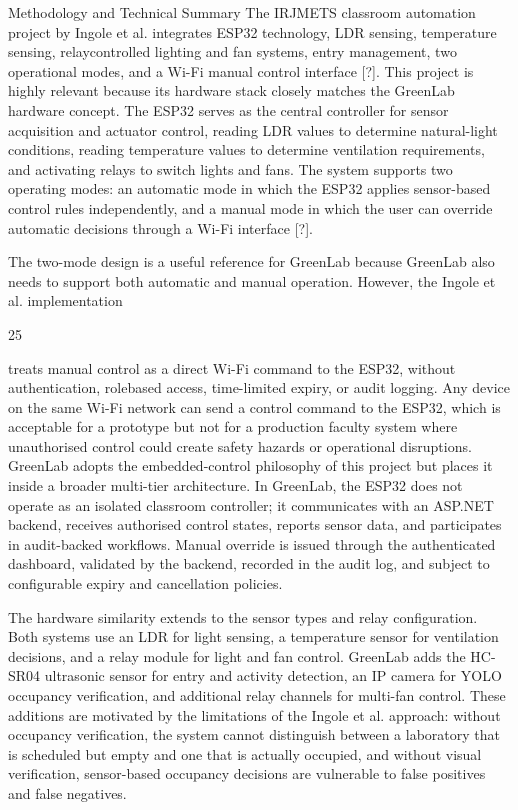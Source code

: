 Methodology and Technical Summary The IRJMETS classroom automation project
by Ingole et al. integrates ESP32 technology, LDR sensing, temperature sensing, relaycontrolled lighting and fan systems, entry management, two operational modes, and a
Wi-Fi manual control interface [?]. This project is highly relevant because its hardware
stack closely matches the GreenLab hardware concept. The ESP32 serves as the central
controller for sensor acquisition and actuator control, reading LDR values to determine
natural-light conditions, reading temperature values to determine ventilation requirements,
and activating relays to switch lights and fans. The system supports two operating modes:
an automatic mode in which the ESP32 applies sensor-based control rules independently,
and a manual mode in which the user can override automatic decisions through a Wi-Fi
interface [?].

The two-mode design is a useful reference for GreenLab because GreenLab also needs
to support both automatic and manual operation. However, the Ingole et al. implementation

25


treats manual control as a direct Wi-Fi command to the ESP32, without authentication, rolebased access, time-limited expiry, or audit logging. Any device on the same Wi-Fi network
can send a control command to the ESP32, which is acceptable for a prototype but not for a
production faculty system where unauthorised control could create safety hazards or operational disruptions. GreenLab adopts the embedded-control philosophy of this project but
places it inside a broader multi-tier architecture. In GreenLab, the ESP32 does not operate
as an isolated classroom controller; it communicates with an ASP.NET backend, receives
authorised control states, reports sensor data, and participates in audit-backed workﬂows.
Manual override is issued through the authenticated dashboard, validated by the backend,
recorded in the audit log, and subject to conﬁgurable expiry and cancellation policies.

The hardware similarity extends to the sensor types and relay conﬁguration. Both
systems use an LDR for light sensing, a temperature sensor for ventilation decisions, and
a relay module for light and fan control. GreenLab adds the HC-SR04 ultrasonic sensor
for entry and activity detection, an IP camera for YOLO occupancy veriﬁcation, and additional relay channels for multi-fan control. These additions are motivated by the limitations
of the Ingole et al. approach: without occupancy veriﬁcation, the system cannot distinguish between a laboratory that is scheduled but empty and one that is actually occupied,
and without visual veriﬁcation, sensor-based occupancy decisions are vulnerable to false
positives and false negatives.



